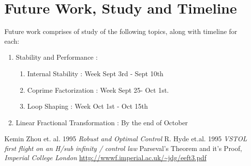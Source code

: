 \documentclass[a4paper,12pt]{article}
\begin{document}
\section{Future Work, Study and Timeline}
	Future work comprises of study of the following topics, along with timeline for each:
		\begin{enumerate}
			\item Stability and Performance :
				\begin{enumerate}
					\item Internal Stability : Week Sept 3rd - Sept 10th
					\item Coprime Factorization : Week Sept 25- Oct 1st.
					\item Loop Shaping : Week Oct 1st - Oct 15th
				\end{enumerate}
			\item Linear Fractional Transformation : By the end of October
		\end{enumerate}
\begin{thebibliography}{20}

 Kemin Zhou et. al. 1995 \emph{Robust and Optimal Control}
 R. Hyde et.al. 1995 \emph{VSTOL first flight on an H/sub infinity / control law}
 Parseval's Theorem and it's Proof, \emph{Imperial College London} \url{http://wwwf.imperial.ac.uk/~jdg/eeft3.pdf}
\end{thebibliography}
\end{document}

